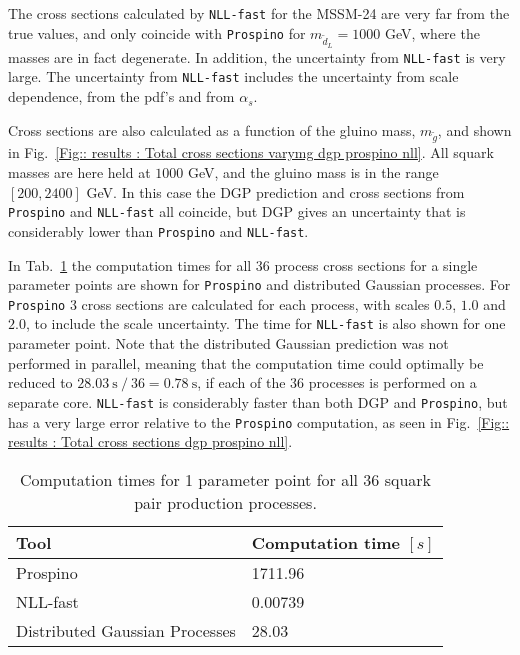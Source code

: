 \documentclass[twoside,english]{uiofysmaster}
\begin{document}
The cross sections calculated by \verb|NLL-fast| for the MSSM-24 are very far from the true values, and only coincide with \verb|Prospino| for $m_{\tilde{d}_L}=1000$ GeV, where the masses are in fact degenerate. In addition, the uncertainty from \verb|NLL-fast| is very large. The uncertainty from \verb|NLL-fast| includes the uncertainty from scale dependence, from the pdf's and from $\alpha_s$.

Cross sections are also calculated as a function of the gluino mass, $m_{\tilde{g}}$, and shown in Fig.~\ref{Fig:: results : Total cross sections varymg dgp prospino nll}. All squark masses are here held at $1000$ GeV, and the gluino mass is in the range $[200, 2400]$ GeV. In this case the DGP prediction and cross sections from \verb|Prospino| and \verb|NLL-fast| all coincide, but DGP gives an uncertainty that is considerably lower than \verb|Prospino| and \verb|NLL-fast|. 

In Tab.~\ref{Tab :: results : Computation times} the computation times for all 36 process cross sections for a single parameter points are shown for \verb|Prospino| and distributed Gaussian processes. For \verb|Prospino| 3 cross sections are calculated for each process, with scales $0.5$, $1.0$ and $2.0$, to include the scale uncertainty. The time for \verb|NLL-fast| is also shown for one parameter point. Note that the distributed Gaussian prediction was not performed in parallel, meaning that the computation time could optimally be reduced to $28.03~ \mathrm{s}~/~ 36 = 0.78 ~\mathrm{s}$, if each of the 36 processes is performed on a separate core. \verb|NLL-fast| is considerably faster than both DGP and \verb|Prospino|, but has a very large error relative to the \verb|Prospino| computation, as seen in Fig.~\ref{Fig:: results : Total cross sections dgp prospino nll}.

\begin{table}
\centering
\begin{tabular}{@{}ll@{}} \toprule
Tool & Computation time $[s]$\\ \midrule
Prospino & 1711.96 \\
NLL-fast & 0.00739\\
Distributed Gaussian Processes & 28.03\\
\bottomrule
\end{tabular}
\caption{Computation times for 1 parameter point for all 36 squark pair production processes.}
\label{Tab :: results : Computation times}
\end{table}
\end{document}
